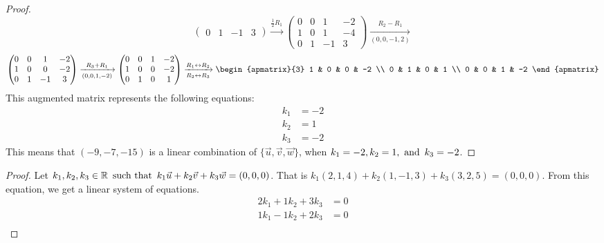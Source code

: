 \documentclass{article}
\begin{document}
\begin{enumerate}
\begin{proof}
\[\begin{pmatrix}
                0 & 1 & -1 & 3
            \end{pmatrix} \xrightarrow{\frac{1}{2}R_1}
            \begin{pmatrix}
                0 & 0 & 1  & -2 \\
                1 & 0 & 1  & -4 \\
                0 & 1 & -1 & 3
            \end{pmatrix} \xrightarrow[(0,0,-1,2)]{R_2 - R_1}
        \]
        \[
            \begin{pmatrix}
                0 & 0 & 1  & -2 \\
                1 & 0 & 0  & -2 \\
                0 & 1 & -1 & 3
            \end{pmatrix} \xrightarrow[(0,0,1,-2)]{R_3 + R_1}
            \begin{pmatrix}
                0 & 0 & 1 & -2 \\
                1 & 0 & 0 & -2 \\
                0 & 1 & 0 & 1
            \end{pmatrix} \xrightarrow[R_2 \leftrightarrow R_3]{R_1 \leftrightarrow R_2}
            \begin{apmatrix}{3}
                1 & 0 & 0 & -2 \\
                0 & 1 & 0 & 1 \\
                0 & 0 & 1 & -2
            \end{apmatrix}
        \]
        This augmented matrix represents the following equations:
        \begin{align*}
            k_1 & = -2 \\
            k_2 & = 1  \\
            k_3 & = -2
        \end{align*}
        This means that $(-9,-7,-15)$ is a linear combination of $\{\vec{u},\vec{v},\vec{w}\}$, when $k_1 = -2, k_2 = 1, \operatorname{~\text{and}~} k_3 = -2$.
    \end{proof}
    \begin{proof}
        Let $k_1,k_2,k_3 \in \mathbb{R} \operatorname{~\text{such that}~} k_1\vec{u} + k_2\vec{v} + k_3\vec{w} = (0,0,0)$. That is $k_1(2,1,4) + k_2(1,-1,3) + k_3(3,2,5) = (0,0,0)$. From this equation, we get a linear system of equations.
        \begin{align*}
            2k_1 + 1k_2 + 3k_3 & = 0 \\
            1k_1 - 1k_2 + 2k_3 & = 0 \\

\end{align*}
\end{proof}
\end{enumerate}
\end{document}
